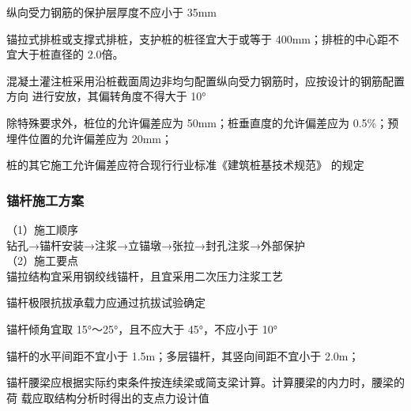  纵向受力钢筋的保护层厚度不应小于 35mm

 锚拉式排桩或支撑式排桩，支护桩的桩径宜大于或等于 400mm；排桩的中心距不宜大于桩直径的 2.0倍。

 混凝土灌注桩采用沿桩截面周边非均匀配置纵向受力钢筋时，应按设计的钢筋配置方向
进行安放，其偏转角度不得大于 10°

 除特殊要求外，桩位的允许偏差应为 50mm；桩垂直度的允许偏差应为 0.5\%；预埋件位置的允许偏差应为 20mm；

 桩的其它施工允许偏差应符合现行行业标准《建筑桩基技术规范》 的规定

\begin{table}
    \centering
    \caption{土层系数表}
    \label{tab:c6t1}
    \end{table}   


\subsubsection{锚杆施工方案}

（1）施工顺序\\

钻孔→锚杆安装→注浆→立锚墩→张拉→封孔注浆→外部保护\\

（2）施工要点\\

 锚拉结构宜采用钢绞线锚杆，且宜采用二次压力注浆工艺

 锚杆极限抗拔承载力应通过抗拔试验确定

 锚杆倾角宜取 15°～25°，且不应大于 45°，不应小于 10°

 锚杆的水平间距不宜小于 1.5m；多层锚杆，其竖向间距不宜小于 2.0m；

 锚杆腰梁应根据实际约束条件按连续梁或简支梁计算。计算腰梁的内力时，腰梁的荷
载应取结构分析时得出的支点力设计值

